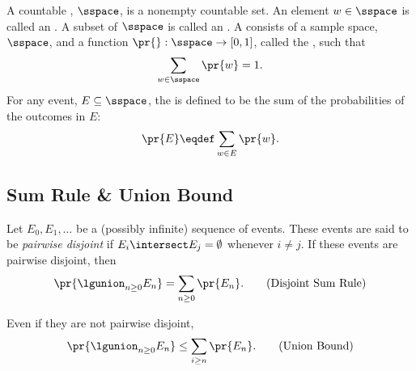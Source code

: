 \documentclass[handout]{mcs}
\begin{document}
{  A countable , $\sspace$, is a nonempty countable set.
  An element $w \in \sspace$ is called an .  A subset of
  $\sspace$ is called an .
  A  consists of a sample
  space, $\sspace$, and a function $\pr{}: \sspace\to [0,1]$, called
  the , such that
\[
\sum_{w \in \sspace} \pr{w} = 1.
\]
For any event, $E \subseteq \sspace$, the  is
defined to be the sum of the probabilities of the outcomes in $E$:
\[
\pr{E} \eqdef \sum_{w \in E} \pr{w}.
\]

\subsection*{Sum Rule \& Union Bound}

Let $E_0,E_1,\dots$ be a (possibly infinite) sequence of events.  These
events are said to be \emph{pairwise disjoint} if $E_i \intersect E_j =
\emptyset$ whenever $i \neq j$.
If these events are pairwise disjoint, then
\begin{equation}
\pr{\lgunion_{n \geq 0} E_n} = \sum_{n \geq 0} \pr{E_n}.\tag{Disjoint Sum Rule}
\end{equation}

Even if they are not pairwise disjoint,
\begin{equation}
\pr{\lgunion_{n \geq 0} E_n} \leq \sum_{i \geq n} \pr{E_n}.\tag{Union Bound}
\end{equation}
}
\end{document}
